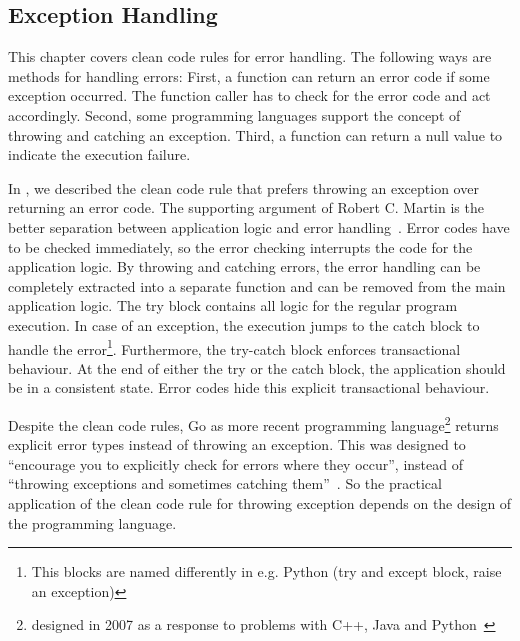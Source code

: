 \subsection{Exception Handling}\label{sec:background:returning_none_and_error_handling}
This chapter covers clean code rules for error handling. The following ways are methods for handling errors:
First, a function can return an error code if some exception occurred. The function caller has to check for the error code and act accordingly. Second, some programming languages support the concept of throwing and catching an exception. Third, a function can return a null value to indicate the execution failure. 

In , we described the clean code rule that prefers throwing an exception over returning an error code. The supporting argument of Robert C. Martin is the better separation between application logic and error handling~\cite{martin_clean_2009}. Error codes have to be checked immediately, so the error checking interrupts the code for the application logic. By throwing and catching errors, the error handling can be completely extracted into a separate function and can be removed from the main application logic. The try block contains all logic for the regular program execution. In case of an exception, the execution jumps to the catch block to handle the error\footnote{This blocks are named differently in e.g. Python (try and except block, raise an exception)}. Furthermore, the try-catch block enforces transactional behaviour. At the end of either the try or the catch block, the application should be in a consistent state. Error codes hide this explicit transactional behaviour. 

Despite the clean code rules, Go as more recent programming language\footnote{designed in 2007 as a response to problems with C++, Java and Python~\cite{noauthor_go_nodate}} returns explicit error types instead of throwing an exception. This was designed to \enquote{encourage you to explicitly check for errors where they occur}, instead of \enquote{throwing exceptions and sometimes catching them}~\cite{gerrand_error_2011}.   
So the practical application of the clean code rule for throwing exception depends on the design of the programming language.

